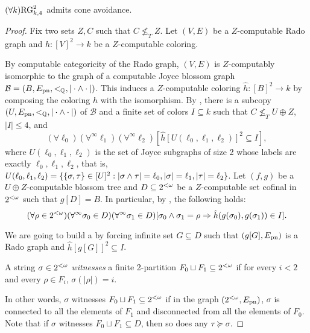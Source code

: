 \begin{theorem}\label{thm:weak-rado-cone-avoidance}
$(\forall k)\mathrm{RG}^2_{k, 4}$ admits cone avoidance.
\end{theorem}
\begin{proof}
Fix two sets $Z, C$ such that $C \not \leq_T Z$.
Let $(V, E)$ be a $Z$-computable Rado graph and $h: [V]^2 \to k$ be a $Z$-computable coloring.

By computable categoricity of the Rado graph, $(V, E)$ is $Z$-computably isomorphic to the graph of a computable Joyce blossom graph $\mathcal{B} = (B, E_{\mathrm{pn}}, <_{\mathbb{Q}}, |\cdot \wedge \cdot|)$.
This induces a $Z$-computable coloring $\hat{h}: [B]^2 \to k$ by composing the coloring $h$ with the isomorphism.
By , there is a subcopy $(U, E_{\mathrm{pn}}, <_{\mathbb{Q}}, |\cdot \wedge \cdot|)$ of $\mathcal{B}$ and a finite set of colors $I \subseteq k$ such that $C \not \leq_T U \oplus Z$, $|I| \leq 4$, and 
\begin{equation}\label{eqn:weak-rado-pairs-ca-1}
(\forall \ell_0)( \forall^{\infty} \ell_1)( \forall^{\infty} \ell_2)[ \hat{h}[U(\ell_0, \ell_1, \ell_2)]^2 \subseteq I],
\end{equation}
where $U(\ell_0, \ell_1, \ell_2)$ is the set of Joyce subgraphs of size 2 whose labels are exactly $\ell_0, \ell_1, \ell_2$, that is, $U(\ell_0, \ell_1, \ell_2) = \{ \{\sigma, \tau\} \in [U]^2: |\sigma \wedge \tau| = \ell_0, |\sigma| = \ell_1, |\tau| = \ell_2 \}$.
Let $(f, g)$ be a $U \oplus Z$-computable blossom tree and $D \subseteq {2^{<\omega}}$ be a $Z$-computable set cofinal in ${2^{<\omega}}$ such that $g[D] = B$. 
In particular, by , the following holds:
\begin{equation}\label{eqn:weak-rado-pairs-ca-2}
(\forall \rho \in {2^{<\omega}})(\forall^{\infty} \sigma_0 \in D)(\forall^{\infty} \sigma_1 \in D)[\sigma_0 \wedge \sigma_1 = \rho \Rightarrow \hat{h}(g(\sigma_0), g(\sigma_1)) \in I].
\end{equation}

We are going to build a by forcing infinite set $G \subseteq D$ such that $(g[G], E_{\mathrm{pn}})$ is a Rado graph and $\hat{h}[g[G]]^2 \subseteq I$. 

\begin{definition}
A string $\sigma \in {2^{<\omega}}$ \emph{witnesses} a finite 2-partition $F_0 \sqcup F_1 \subseteq {2^{<\omega}}$
if for every $i < 2$ and every $\rho \in F_i$, $\sigma(|\rho|) = i$.
\end{definition}

In other words, $\sigma$ witnesses $F_0 \sqcup F_1 \subseteq {2^{<\omega}}$ if in the graph $({2^{<\omega}}, E_{\mathrm{pn}})$, $\sigma$ is connected to all the elements of $F_1$ and disconnected from all the elements of $F_0$.
Note that if $\sigma$ witnesses  $F_0 \sqcup F_1 \subseteq D$, then so does any $\tau \succeq \sigma$.


\end{proof}
